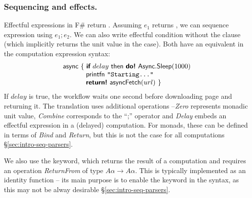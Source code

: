 \documentclass[runningheads,a4paper]{llncs}
\begin{document}
\vspace{-1em}
\subsubsection{Sequencing and effects.} Effectful expressions in F\# return .
Assuming $e_1$ returns , we can sequence expression using $e_1; e_2$. We can also
write effectful  condition without the  clause (which implicitly returns
the unit value in the  case). Both have an equivalent in the computation expression syntax:
%
\begin{equation*}
\begin{array}{l}
\textnormal{\sffamily async}~\{~ \textnormal{\bfseries\sffamily if}~delay~\textnormal{\sffamily then}~\textnormal{\bfseries\sffamily do!}~\textnormal{\sffamily Async}.\textnormal{\sffamily Sleep}(1000)\\
\hspace{3.4em}     \textnormal{\sffamily printfn}~ \texttt{"Starting..."}\\
\hspace{3.4em}     \textnormal{\bfseries\sffamily return!}~ \textnormal{\sffamily asyncFetch}(url) ~\}
\end{array}
\end{equation*}
%
If $delay$ is true, the workflow waits one second before downloading page and returning it.
The translation uses additional operations --\emph{Zero} represents monadic unit value,
\emph{Combine} corresponds to the ``;'' operator and \emph{Delay} embeds an effectful expression
in a (delayed) computation. For monads, these can be defined in terms of \emph{Bind} and \emph{Return},
but this is not the case for all computations \S\ref{sec:intro-seq-parsers}.

We also use the  keyword, which returns the result of a computation and requires
an operation \emph{ReturnFrom} of type $A\alpha \rightarrow A\alpha$. This is typically
implemented as an identity function -- its main purpose is to enable the  keyword in 
the syntax, as this may not be alway desirable \S\ref{sec:intro-seq-parsers}.
\end{document}
